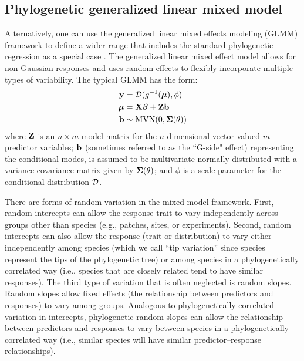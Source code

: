\documentclass[12pt]{article}
\begin{document}
\subsection*{Phylogenetic generalized linear mixed model}
Alternatively, one can use the generalized linear mixed effects modeling (GLMM) framework to define a wider range that includes the standard phylogenetic regression as a special case \citep{lynch1991methods}.
The generalized linear mixed effect model allows for non-Gaussian responses and uses random effects to flexibly incorporate multiple types of variability.
The typical GLMM has the form:
\newcommand{\dist}{{\cal D}}
\begin{equation}
\begin{aligned}
\bY & = \dist(g^{-1}(\bmu), \phi) \\
\bmu & = \bX \bbeta + \bZ \bb  \\
\bb & \sim \textrm{MVN}(0, \bSigma(\theta))  \\
\label{eq:glmm}
\end{aligned}
\end{equation}
where ${\mathbf Z}$ is an $n \times m$ model matrix for the $n$-dimensional vector-valued $m$ predictor variables; ${\mathbf b}$ (sometimes referred to as the ``G-side" effect) representing the conditional modes, is assumed to be multivariate normally distributed with a variance-covariance matrix given by ${\boldsymbol \Sigma}(\theta)$; and $\phi$ is a scale parameter for the conditional distribution $\dist$.

There are forms of random variation in the mixed model framework.
First, random intercepts can allow the response trait to vary independently across groups other than species (e.g., patches, sites, or experiments). 
Second, random intercepts can also allow the response (trait or distribution) to vary either independently among species (which we call ``tip variation'' since species represent the tips of the phylogenetic tree) or among species in a phylogenetically correlated way (i.e., species that are closely related tend to have similar responses).
The third type of variation that is often neglected is random slopes.
Random slopes allow fixed effects (the relationship between predictors and responses) to vary among groups.
Analogous to phylogenetically correlated variation in intercepts, phylogenetic random slopes can allow the relationship between predictors and responses to vary between species in a phylogenetically correlated way (i.e., similar species will have similar predictor--response relationships).
\end{document}
